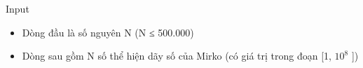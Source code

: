 Input
\begin{itemize}
	\item     Dòng đầu là số nguyên N (N ≤ 500.000)   
	\item     Dòng sau gồm N số thể hiện dãy số của Mirko (có giá trị trong đoạn [1, $10^{8}$    ])    \textbf{}
\end{itemize}